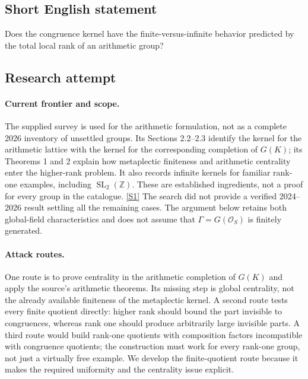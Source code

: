 \documentclass[11pt,a4paper]{article}
\newcommand{\Z}{\mathbb{Z}}
\newcommand{\sref}[2]{\hyperlink{source:#1:#2}{[S#2]}}
\numberwithin{equation}{section}
\begin{document}
\subsection{Short English statement}
Does the congruence kernel have the finite-versus-infinite behavior predicted by the total local rank of an arithmetic group?
\subsection{Research attempt}

\paragraph{Current frontier and scope.}
The supplied survey is used for the arithmetic formulation, not as a
complete 2026 inventory of unsettled groups.  Its Sections 2.2--2.3 identify
the kernel for the arithmetic lattice with the kernel for the corresponding
completion of $G(K)$; its Theorems 1 and 2 explain how metaplectic finiteness
and arithmetic centrality enter the higher-rank problem.  It also records
infinite kernels for familiar rank-one examples, including
$\operatorname{SL}_2(\Z)$.  These are established ingredients, not a proof
for every group in the catalogue. \sref{119}{1}
The search did not provide a verified 2024--2026 result settling all the
remaining cases.  The argument below retains both global-field
characteristics and does not assume that $\Gamma=G(\mathcal O_S)$ is
finitely generated.

\paragraph{Attack routes.}
One route is to prove centrality in the arithmetic completion of $G(K)$
and apply the source's arithmetic theorems.  Its missing step is global
centrality, not the already available finiteness of the metaplectic
kernel.  A second route tests every finite quotient directly: higher rank
should bound the part invisible to congruences, whereas rank one should
produce arbitrarily large invisible parts.  A third route would build
rank-one quotients with composition factors incompatible with congruence
quotients; the construction must work for every rank-one group, not just
a virtually free example.  We develop the finite-quotient route because
it makes the required uniformity and the centrality issue explicit.
\end{document}
